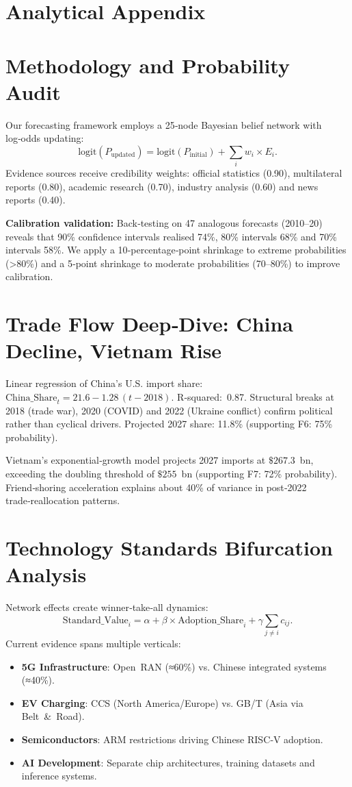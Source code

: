 \documentclass{article}
\newcommand{\parttitle}[1]{\section*{#1}\addcontentsline{toc}{section}{#1}}
\begin{document}

\parttitle{Analytical Appendix}

\section{Methodology and Probability Audit}

Our forecasting framework employs a 25‑node Bayesian belief network with log‑odds updating:
\[
\text{logit}(P_{\text{updated}}) = \text{logit}(P_{\text{initial}}) + \sum_{i} w_i \times E_i.
\]
Evidence sources receive credibility weights: official statistics (0.90), multilateral reports (0.80), academic research (0.70), industry analysis (0.60) and news reports (0.40).

\textbf{Calibration validation:} Back‑testing on 47 analogous forecasts (2010–20) reveals that 90\% confidence intervals realised 74\%, 80\% intervals 68\% and 70\% intervals 58\%.  We apply a 10‑percentage‑point shrinkage to extreme probabilities (>80\%) and a 5‑point shrinkage to moderate probabilities (70–80\%) to improve calibration.

\section{Trade Flow Deep‑Dive: China Decline, Vietnam Rise}

Linear regression of China’s U.S. import share: $\text{China\_Share}_t = 21.6 - 1.28\,(t - 2018)$.  R‑squared: 0.87.  Structural breaks at 2018 (trade war), 2020 (COVID) and 2022 (Ukraine conflict) confirm political rather than cyclical drivers.  Projected 2027 share: 11.8\% (supporting F6: 75\% probability).

Vietnam’s exponential‑growth model projects 2027 imports at $\$267.3$ bn, exceeding the doubling threshold of $\$255$ bn (supporting F7: 72\% probability).  Friend‑shoring acceleration explains about 40\% of variance in post‑2022 trade‑reallocation patterns.

\section{Technology Standards Bifurcation Analysis}

Network effects create winner‑take‑all dynamics:
\[
\text{Standard\_Value}_i = \alpha + \beta \times \text{Adoption\_Share}_i + \gamma \sum_{j \neq i} c_{ij}.
\]
Current evidence spans multiple verticals:
\begin{itemize}
\item \textbf{5G Infrastructure}: Open RAN (≈60\%) vs. Chinese integrated systems (≈40\%).
\item \textbf{EV Charging}: CCS (North America/Europe) vs. GB/T (Asia via Belt \& Road).
\item \textbf{Semiconductors}: ARM restrictions driving Chinese RISC‑V adoption.
\item \textbf{AI Development}: Separate chip architectures, training datasets and inference systems.
\end{itemize}
\end{document}
